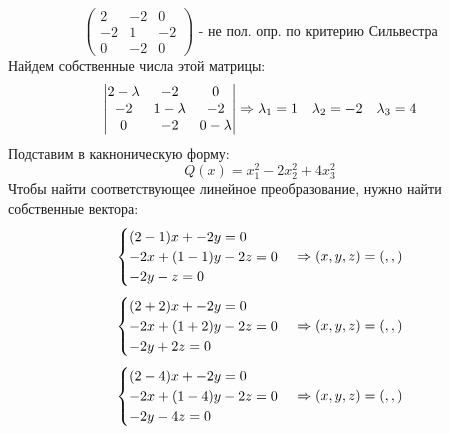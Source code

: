 \documentclass[12pt, fleqn]{article}
\begin{document}
\begin{Sol}
  \[\begin{pmatrix}
    2 & -2 & 0\\
    -2 & 1 & -2\\
    0 & -2 & 0
  \end{pmatrix} \text{ - не пол. опр. по критерию Сильвестра}\]
  Найдем собственные числа этой матрицы:
  \[\begin{vmatrix}
    2 - \lambda & -2 & 0\\
    -2 & 1 - \lambda & -2\\
    0 & -2 & 0 - \lambda
  \end{vmatrix} \Rightarrow \lambda_1 = 1\quad \lambda_2 = -2\quad \lambda_3 = 4\]
  Подставим в какноническую форму:
  \[Q(x) = x_1^2 - 2x_2^2 + 4x_3^2\]
  Чтобы найти соответствующее линейное преобразование, нужно найти собственные вектора:
  \[\begin{cases}
    (2-1)x + -2y = 0\\
    -2x + (1-1)y -2z = 0\\
    -2y -z = 0
  \end{cases} \Rightarrow (x,y,z) = (,,)\]
  \[\begin{cases}
    (2+2)x + -2y = 0\\
    -2x + (1+2)y -2z = 0\\
    -2y +2z = 0
  \end{cases} \Rightarrow (x,y,z) = (,,)\]
  \[\begin{cases}
    (2-4)x + -2y = 0\\
    -2x + (1-4)y -2z = 0\\
    -2y - 4z = 0
  \end{cases} \Rightarrow (x,y,z) = (,,)\]
\end{Sol}
\end{document}
